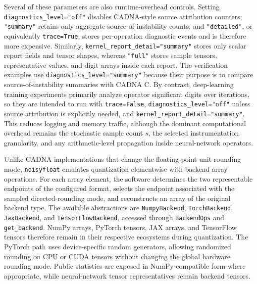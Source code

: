 \documentclass[manuscript, screen]{acmart}
\begin{document}
Several of these parameters are also runtime-overhead controls. Setting \texttt{diagnostics\_level="off"} disables CADNA-style source attribution counters; \texttt{"summary"} retains only aggregate source-of-instability counts; and \texttt{"detailed"}, or equivalently \texttt{trace=True}, stores per-operation diagnostic events and is therefore more expensive. Similarly, \texttt{kernel\_report\_detail="summary"} stores only scalar report fields and tensor shapes, whereas \texttt{"full"} stores sample tensors, representative values, and digit arrays inside each report. The verification examples use \texttt{diagnostics\_level="summary"} because their purpose is to compare source-of-instability summaries with CADNA C. By contrast, deep-learning training experiments primarily analyze operator significant digits over iterations, so they are intended to run with \texttt{trace=False}, \texttt{diagnostics\_level="off"} unless source attribution is explicitly needed, and \texttt{kernel\_report\_detail="summary"}. This reduces logging and memory traffic, although the dominant computational overhead remains the stochastic sample count $s$, the selected instrumentation granularity, and any arithmetic-level propagation inside neural-network operators.

Unlike CADNA implementations that change the floating-point unit rounding mode, \texttt{noisyfloat} emulates quantization elementwise with backend array operations. For each array element, the software determines the two representable endpoints of the configured format, selects the endpoint associated with the sampled directed-rounding mode, and reconstructs an array of the original backend type. The available abstractions are \texttt{NumpyBackend}, \texttt{TorchBackend}, \texttt{JaxBackend}, and \texttt{TensorFlowBackend}, accessed through \texttt{BackendOps} and \texttt{get\_backend}. NumPy arrays, PyTorch tensors, JAX arrays, and TensorFlow tensors therefore remain in their respective ecosystems during quantization. The PyTorch path uses device-specific random generators, allowing randomized rounding on CPU or CUDA tensors without changing the global hardware rounding mode. Public statistics are exposed in NumPy-compatible form where appropriate, while neural-network tensor representatives remain backend tensors.
\end{document}
